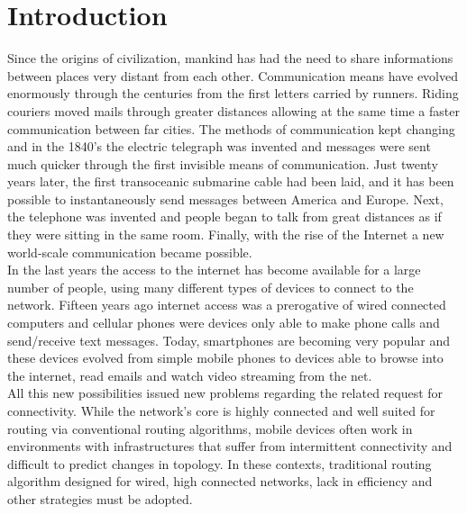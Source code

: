 
\chapter{Introduction}\label{introduzione} %





Since the origins of civilization, mankind has had the need to share informations between places very distant from each other. Communication means have evolved enormously through the centuries from the first letters carried by runners. Riding couriers moved mails through greater distances allowing at the same time a faster communication between far cities. The methods of communication kept changing and in the 1840's the electric telegraph was invented and messages were sent much quicker through the first invisible means of communication. Just twenty years later, the first transoceanic submarine cable had been laid, and it has been possible to instantaneously send messages between America and Europe. Next, the telephone was invented and people began to talk from great distances as if they were sitting in the same room. Finally, with the rise of the Internet a new world-scale communication became possible.
\\

In the last years the access to the internet has become available for a large number of people, using many different types of devices to connect to the network. Fifteen years ago internet access was a prerogative of wired connected computers and cellular phones were devices only able to make phone calls and send/receive text messages. Today, smartphones are becoming very popular and these devices evolved from simple mobile phones to devices able to browse into the internet, read emails and watch video streaming from the net.
\\

All this new possibilities issued new problems regarding the related request for connectivity. While the network's core is highly connected and well suited for routing via
conventional routing algorithms, mobile devices often work in environments with infrastructures that suffer from intermittent connectivity and difficult to predict changes in topology. In these contexts, traditional routing algorithm designed for wired, high connected networks, lack in efficiency and other strategies must be adopted.
\\

